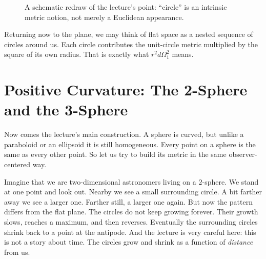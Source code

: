 \begin{figure}[htbp]
\centering
{}
\caption{A schematic redraw of the lecture's point: ``circle'' is an intrinsic metric notion, not merely a Euclidean appearance.}
\end{figure}

Returning now to the plane, we may think of flat space as a nested sequence of circles around us. Each circle contributes the unit-circle metric multiplied by the square of its own radius. That is exactly what \(r^2 d\Omega_1^2\) means.

\section{Positive Curvature: The 2-Sphere and the 3-Sphere}

Now comes the lecture's main construction. A sphere is curved, but unlike a paraboloid or an ellipsoid it is still homogeneous. Every point on a sphere is the same as every other point. So let us try to build its metric in the same observer-centered way.

Imagine that we are two-dimensional astronomers living on a \(2\)-sphere. We stand at one point and look out. Nearby we see a small surrounding circle. A bit farther away we see a larger one. Farther still, a larger one again. But now the pattern differs from the flat plane. The circles do not keep growing forever. Their growth slows, reaches a maximum, and then reverses. Eventually the surrounding circles shrink back to a point at the antipode. And the lecture is very careful here: this is not a story about time. The circles grow and shrink as a function of \emph{distance} from us.

